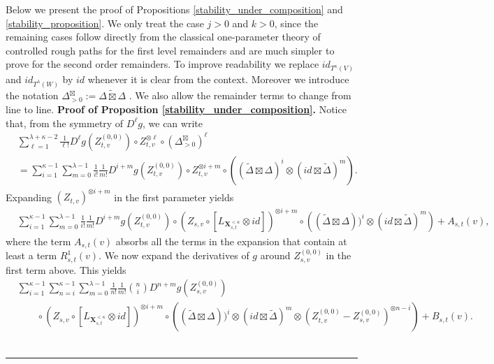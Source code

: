 \documentclass{article}%
\newenvironment{proof}[1][Proof]{\noindent\textbf{#1.} }{\ \rule{0.5em}{0.5em}}
\begin{document}
Below we present the proof of Propositions \ref{stability_under_composition} and \ref{stability_proposition}.\newline
We only treat the case $j>0$ and $k>0$, since the remaining cases follow
directly from the classical one-parameter theory of controlled rough paths for  the first level remainders and are much simpler to prove for the second order remainders. To improve readability we replace $id_{T^{\kappa}(V)}$ and $id_{T^{\lambda}(W)}$ by $id$ whenever it is clear from the context. Moreover we introduce the notation $\Delta^{\boxtimes}_{>0} := \widetilde{\Delta \boxtimes \Delta}$ .  We also allow the remainder terms to change from line to line. \newline
\begin{proof}[Proof of Proposition 
\ref{stability_under_composition}]
Notice that, from the symmetry of $D^\ell g$, we can write
\begin{align}
&\sum_{\ell=1}^{\lambda+\kappa-2} \frac{1}{\ell!}
D^\ell g\left(Z^{(0,0)}_{t,v}\right)
\circ Z^{\otimes \ell}_{t,v}
\circ (\Delta^{\boxtimes}_{>0})^\ell \label{original_expression_expansion_g}\\
&=
\sum_{i = 1}^{\kappa -1} \sum_{m = 0}^{\lambda -1} \frac{1}{i!} \frac{1}{m!} D^{i+m}g(Z^{(0,0)}_{t,v}) \circ Z^{\otimes i + m}_{t,v} \circ \left( (\tilde{\Delta} \boxtimes \Delta)^{i} \otimes ( id \boxtimes \tilde{\Delta})^{m} \right). \nonumber
\end{align}
Expanding $(Z_{t,v})^{\otimes i+m}$ in the first parameter yields 
\begin{align}
&\sum_{i = 1}^{\kappa -1} \sum_{m = 0}^{\lambda -1} \frac{1}{i!} \frac{1}{m!} D^{i+m}g(Z^{(0,0)}_{t,v}) \circ (Z_{s,v} \circ [L_{\mathbf{X}^{<\kappa}_{s,t}} \otimes id])^{\otimes i + m} \circ \left((\tilde{\Delta} \boxtimes \Delta))^{i} \otimes ( id \boxtimes \tilde{\Delta})^{m} \right) + A_{s,t}(v),
\end{align}
where the term $A_{s,t}(v)$ absorbs all the terms in the expansion that contain at least a term $R^1_{s,t}(v)$.\newline
We now expand the derivatives of $g$ around $Z^{(0,0)}_{s,v}$ in the first term above.
This yields
\begin{align*}
&\sum_{i = 1}^{\kappa -1} \sum_{n = i}^{\kappa -1} \sum_{m = 0}^{\lambda -1} \frac{1}{n!} \frac{1}{m!} \binom{n}{i} D^{n+m}g(Z^{(0,0)}_{s,v})\\
& \qquad \circ (Z_{s,v} \circ [L_{\mathbf{X}^{<\kappa}_{s,t}} \otimes id])^{\otimes i + m} \circ \left((\tilde{\Delta} \boxtimes \Delta))^{i} \otimes ( id \boxtimes \tilde{\Delta})^{m} \otimes (Z^{(0,0)}_{t,v} - Z^{(0,0)}_{s,v})^{\otimes n-i}\right) + B_{s,t}(v).

\end{align*}
\end{proof}
\end{document}
